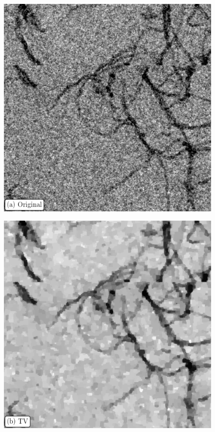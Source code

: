 \begin{figure}[!ht]
  \begin{minipage}{0.32\textwidth}
    \noindent\includegraphics[width=\linewidth]{Figures/chapter-temsaxs/pectin_crop_tile01_500x500_900_1900_label.png}\label{fig:denoise_comparison_pectin_original}
  \end{minipage}
  \begin{minipage}{0.32\textwidth}
    \includegraphics[width=\linewidth]{Figures/chapter-temsaxs/pectin_TV_lam015_crop_tile01_500x500_900_1900_label.png}\label{fig:denoise_comparison_pectin_TV}

\end{minipage}
\end{figure}
